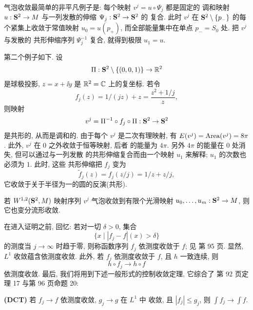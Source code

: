 气泡收敛最简单的非平凡例子是: 每个映射 $v^j=u\circ\Psi_j$ 都是固定的
调和映射 $u:\mathbf{S}^2\to M$ 与一列发散的伸缩 $\Psi_j:\mathbf{S}^2\to\mathbf{S}^2$ 的
复合. 此时 $v^j$ 在 $\mathbf{S}^2\setminus\{p_-\}$ 的每个紧集上收敛于常值映射
$u_0=u(p_+)$, 而全部能量集中在单点 $p_-=S_0$ 处. 把 $v^j$ 与发散的
共形伸缩序列 $\Psi_j^{-1}$ 复合, 就得到极限 $u_1=u$.

第二个例子如下. 设
\begin{equation}
\Pi:\mathbf{S}^2\setminus\{(0,0,1)\}\to\mathbb{R}^2
\label{eq:3.107}
\end{equation}
是球极投影, $z=x+\ii y$ 是 $\mathbb{R}^2=\mathbb{C}$ 上的复坐标. 若令
\begin{equation}
f_j(z)=1/(jz)+z=\frac{z^2+1/j}{z},
\label{eq:3.108}
\end{equation}
则映射
\begin{equation}
v^j=\Pi^{-1}\circ f_j\circ\Pi:\mathbf{S}^2\to\mathbf{S}^2
\label{eq:3.109}
\end{equation}
是共形的, 从而是调和的. 由于每个 $v^j$ 是二次有理映射, 有
$E(v^j)=\operatorname{Area}(v^j)=8\pi$. 此外, $v^j$ 在 $0$ 之外收敛于恒等映射, 后者
的能量为 $4\pi$. 另外 $4\pi$ 的能量在 $0$ 处消失, 但可以通过与一列发散
的共形伸缩复合而由一个映射 $u_1$ 来解释; $u_1$ 的次数也必须为 $1$. 此时, 这些
共形伸缩把 $f_j$ 变为
\begin{equation}
\tilde{f}_j(z)=f_j(z/j)=1/z+z/j,
\label{eq:3.110}
\end{equation}
它收敛于关于半径为一的圆的反演(共形).


\begin{proposition}
\label{prop:3.27}
若 $W^{1,2}(\mathbf{S}^2,M)$ 映射序列 $v^j$ 气泡收敛到有限个光滑映射
$u_0,\dots,u_m:\mathbf{S}^2\to M$, 则它也变分流形收敛.
\end{proposition}

在进入证明之前, 回忆: 若对一切 $\delta>0$, 集合
\begin{equation}
\{x\mid|f_j-f|(x)>\delta\}
\label{eq:3.111}
\end{equation}
的测度当 $j\to\infty$ 时趋于零, 则称函数序列 $f_j$ 依测度收敛于 $f$;
见 \cite{R} 第 95 页. 显然, $L^1$ 收敛蕴含依测度收敛. 此外, 若 $f_j$
依测度收敛于 $f$, 且 $h$ 一致连续, 则
\[
h\circ f_j\to h\circ f
\]
依测度收敛. 最后, 我们将用到下述一般形式的控制收敛定理, 它综合了
\cite{R} 第 92 页定理 17 与第 96 页命题 20:

\smallskip
\noindent\textbf{(DCT)} 若 $f_j\to f$ 依测度收敛, $g_j\to g$ 在 $L^1$ 中
收敛, 且 $|f_j|\leq g_j$, 则 $\int f_j\to\int f$.
\smallskip

